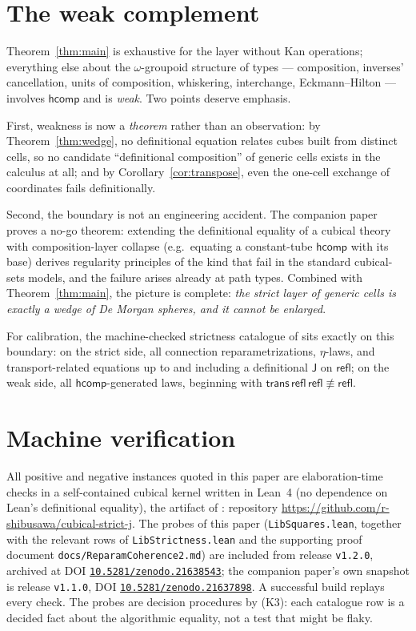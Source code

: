 \documentclass[11pt]{amsart}
\theoremstyle{definition}
\newcommand{\nconv}{\not\equiv}
\newcommand{\refl}{\mathsf{refl}}
\newcommand{\hcomp}{\mathsf{hcomp}}
\begin{document}
\section{The weak complement}
\label{sec:weak}

Theorem~\ref{thm:main} is exhaustive for the layer without Kan
operations; everything else about the $\omega$-groupoid structure
of types --- composition, inverses' cancellation, units of
composition, whiskering, interchange, Eckmann--Hilton --- involves
$\hcomp$ and is \emph{weak}.  Two points deserve emphasis.

First, weakness is now a \emph{theorem} rather than an observation:
by Theorem~\ref{thm:wedge}, no definitional equation relates cubes
built from distinct cells, so no candidate ``definitional
composition'' of generic cells exists in the calculus at all; and by
Corollary~\ref{cor:transpose}, even the one-cell exchange of
coordinates fails definitionally.

Second, the boundary is not an engineering accident.  The
companion paper \cite{Companion} proves a no-go theorem: extending
the definitional equality of a cubical theory with
composition-layer collapse (e.g.\ equating a constant-tube
$\hcomp$ with its base) derives regularity principles of the kind
that fail in the standard cubical-sets models, and the failure
arises already at path types.  Combined with
Theorem~\ref{thm:main}, the picture is complete: \emph{the strict
layer of generic cells is exactly a wedge of De Morgan spheres, and
it cannot be enlarged}.

For calibration, the machine-checked strictness catalogue of
\cite{Companion} sits exactly on this boundary: on the strict side,
all connection reparametrizations, $\eta$-laws, and
transport-related equations up to and including a definitional
$\mathsf{J}$ on $\refl$; on the weak side, all $\hcomp$-generated
laws, beginning with $\mathsf{trans}\,\refl\,\refl \nconv \refl$.

\section{Machine verification}
\label{sec:artifact}

All positive and negative instances quoted in this paper are
elaboration-time checks in a self-contained cubical kernel written
in Lean~4 (no dependence on Lean's definitional equality), the
artifact of \cite{Companion}: repository
\url{https://github.com/r-shibusawa/cubical-strict-j}.
The probes of this paper (\texttt{LibSquares.lean}, together with
the relevant rows of \texttt{LibStrictness.lean} and the supporting
proof document \texttt{docs/ReparamCoherence2.md}) are included from
release \texttt{v1.2.0}, archived at DOI
\href{https://doi.org/10.5281/zenodo.21638543}%
{\texttt{10.5281/zenodo.21638543}}; the companion paper's own snapshot
is release \texttt{v1.1.0}, DOI
\href{https://doi.org/10.5281/zenodo.21637898}%
{\texttt{10.5281/zenodo.21637898}}.
A successful build replays every check.  The probes are decision
procedures by (K3): each catalogue row is a decided fact about the
algorithmic equality, not a test that might be flaky.
\end{document}
